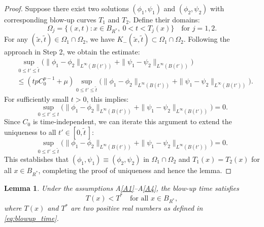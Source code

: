 \documentclass[
  sn-mathphys-num,
  colorlinks,
  linkcolor=darkmagenta,
  citecolor=rufous,
  urlcolor=zaffre,
  hypertexnames=false
]{sn-jnl}
\numberwithin{equation}{section}
\newtheorem{lemma}[theorem]{Lemma}%
\begin{document}
\begin{proof}
Suppose there exist two solutions $(\phi_1, \psi_1)$ and $(\phi_2, \psi_2)$ with corresponding blow-up curves $T_1$ and $T_2$. Define their domains:
$$
\Omega_j = \{(x, t) : x \in B_{R^*}, \ 0 < t < T_j(x)\} \quad \text{for } j = 1,2.
$$
For any $(\tilde{x}, \tilde{t}) \in \Omega_1 \cap \Omega_2$, we have $K_-(\tilde{x}, \tilde{t}) \subset \Omega_1 \cap \Omega_2$. Following the approach in Step 2, we obtain the estimate:
$$\begin{aligned}
&\sup_{0 \leq t' \leq \tilde{t}} \Big( \|\phi_1 - \phi_2\|_{L^\infty(B(t'))} + \|\psi_1 - \psi_2\|_{L^\infty(B(t'))} \Big)\\
&\leq (t p C_0^{p-1} + \mu) \sup_{0 \leq t' \leq \tilde{t}} \Big( \|\phi_1 - \phi_2\|_{L^\infty(B(t'))} + \|\psi_1 - \psi_2\|_{L^\infty(B(t'))} \Big).
\end{aligned}
$$
For sufficiently small $t > 0$, this implies:
$$
\sup_{0 \leq t' \leq t} \Big( \|\phi_1 - \phi_2\|_{L^\infty(B(t'))} + \|\psi_1 - \psi_2\|_{L^\infty(B(t'))} \Big) = 0.
$$
Since $C_0$ is time-independent, we can iterate this argument to extend the uniqueness to all $t' \in [0, \tilde{t}\,]$:
$$
\sup_{0 \leq t' \leq \tilde{t}} \Big( \|\phi_1 - \phi_2\|_{L^\infty(B(t'))} + \|\psi_1 - \psi_2\|_{L^\infty(B(t'))} \Big) = 0.
$$
This establishes that
 $(\phi_1, \psi_1) \equiv (\phi_2, \psi_2)$ in $\Omega_1 \cap \Omega_2$ and
 $T_1(x) = T_2(x)$ for all $x \in B_{R^*}$,
completing the proof of uniqueness and hence the lemma.
\end{proof}
\begin{lemma}
Under the assumptions A\ref{A1}--A\ref{A4}, the blow-up time satisfies
$$
T(x) < T^* \quad \text{for all } x \in B_{R^*},
$$
where $T(x)$ and $T^*$ are two positive real numbers as defined in \eqref{eq:blowup_time}.
\end{lemma}
\end{document}
